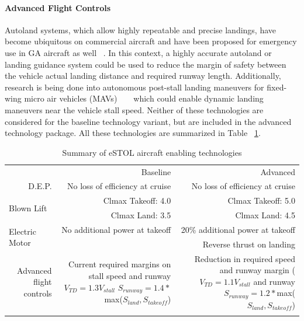 \documentclass[]{aiaa-tc}%
\begin{document}
\paragraph{Advanced Flight Controls}
Autoland systems, which allow highly repeatable and precise landings, have become ubiquitous on commercial aircraft and have been proposed for emergency use in GA aircraft as well ~\cite{diana}.  In this context, a highly accurate autoland or landing guidance system could be used to reduce the margin of safety between the vehicle actual landing distance and required runway length.  Additionally, research is being done into autonomous post-stall landing maneuvers for fixed-wing micro air vehicles (MAVs) ~\cite{percher1} ~\cite{percher2} which could enable dynamic landing maneuvers near the vehicle stall speed.  Neither of these technologies are considered for the baseline technology variant, but are included in the advanced technology package.  All these technologies are summarized in Table ~\ref{t:tech}. 

\begin{table}[htbp]
  \centering
  \caption{Summary of eSTOL aircraft enabling technologies}
    \begin{tabular}{rrr}
          &       &  \\
    \midrule
          & \multicolumn{1}{p{14.915em}}{Baseline} & \multicolumn{1}{p{14.5em}}{Advanced} \\
    \midrule
    \multicolumn{1}{p{8.415em}}{D.E.P. } & \multicolumn{1}{p{14.915em}}{No loss of efficiency at cruise} & \multicolumn{1}{p{14.5em}}{No loss of efficiency at cruise} \\
    \multicolumn{1}{l}{\multirow{2}[0]{*}{Blown Lift}} & \multicolumn{1}{p{14.915em}}{Clmax Takeoff: 4.0} & \multicolumn{1}{p{14.5em}}{Clmax Takeoff: 5.0} \\
          & \multicolumn{1}{p{14.915em}}{Clmax Land: 3.5} & \multicolumn{1}{p{14.5em}}{Clmax Land: 4.5} \\
    \multicolumn{1}{l}{\multirow{2}[0]{*}{Electric Motor}} & \multicolumn{1}{p{14.915em}}{No additional power at takeoff} & \multicolumn{1}{p{14.5em}}{20\% additional power at takeoff} \\
          &       & \multicolumn{1}{p{14.5em}}{Reverse thrust on landing} \\
    \multicolumn{1}{p{8.415em}}{Advanced flight controls} & \multicolumn{1}{p{14.915em}}{Current required margins on stall speed and runway $V_{TD} = 1.3 V_{stall}$ $S_{runway} = 1.4*$max($S_{land}, S_{takeoff}$)} & \multicolumn{1}{p{14.5em}}{Reduction in required speed and runway margin ($V_{TD} = 1.1 V_{stall}$ and runway $S_{runway} = 1.2*$max($S_{land}, S_{takeoff}$)} \\
    \midrule
          &       &  \\
    \end{tabular}%
  \label{t:tech}%
\end{table}%
\end{document}
